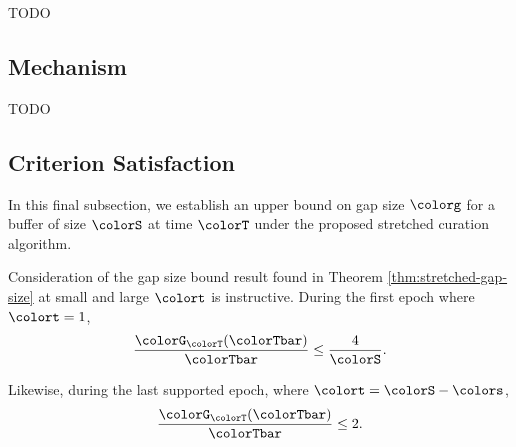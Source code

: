 TODO

\subsection{Mechanism}



TODO

\subsection{Criterion Satisfaction}

In this final subsection, we establish an upper bound on gap size $\colorg$ for a buffer of size $\colorS$ at time $\colorT$ under the proposed stretched curation algorithm.





Consideration of the gap size bound result found in Theorem \ref{thm:stretched-gap-size} at small and large $\colort$ is instructive.
During the first epoch where $\colort = 1$,
\begin{align*}
\frac{\colorG_{\colorT}(\colorTbar)}{\colorTbar}
\leq
\frac{4}{\colorS}.
\end{align*}

Likewise, during the last supported epoch, where $\colort = \colorS - \colors$,
\begin{align*}
\frac{\colorG_{\colorT}(\colorTbar)}{\colorTbar}
\leq
2.
\end{align*}
